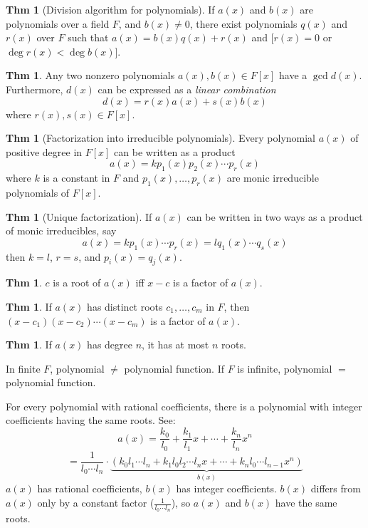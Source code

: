 \documentclass{article}
\theoremstyle{definition}
\newtheorem{theorem}[definition]{Thm}
\begin{document}
\begin{theorem}[Division algorithm for polynomials]
    If $a(x)$ and $b(x)$ are polynomials over a field $F$, and $b(x) \neq 0$, there exist polynomials $q(x)$ and $r(x)$ over $F$ such that
    $a(x) = b(x) q(x) + r(x)$ and
    [$r(x) = 0$ or $\deg r(x) < \deg b(x)$].
\end{theorem}

\begin{theorem}
    Any two nonzero polynomials $a(x), b(x) \in F[x]$ have a $\gcd d(x)$. Furthermore, $d(x)$ can be expressed as a \emph{linear combination}
    $$d(x)= r(x) a(x) + s(x) b(x)$$
    where $r(x), s(x) \in F[x]$.
\end{theorem}

\begin{theorem}[Factorization into irreducible polynomials]
    Every polynomial $a(x)$ of positive degree in $F[x]$ can be written as a product
    $$a(x) = k p_1(x) p_2(x) \cdots p_r(x)$$
    where $k$ is a constant in $F$ and $p_1(x), \ldots, p_r(x)$ are monic irreducible polynomials of $F[x]$.
\end{theorem}

\begin{theorem}[Unique factorization]
    If $a(x)$ can be written in two ways as a product of monic irreducibles, say
    $$a(x) = k p_1(x) \cdots p_r(x) = l q_1(x) \cdots q_s(x)$$
    then $k=l$, $r=s$, and $p_i(x) = q_j(x)$.
\end{theorem}

\begin{theorem}
    $c$ is a root of $a(x)$ iff $x - c$ is a factor of $a(x)$.
\end{theorem}
\begin{theorem}
    If $a(x)$ has distinct roots $c_1, \ldots, c_m$ in $F$, then $(x-c_1)(x-c_2)\cdots(x-c_m)$ is a factor of $a(x)$.
\end{theorem}

\begin{theorem}
    If $a(x)$ has degree $n$, it has at most $n$ roots.
\end{theorem}

In finite $F$, polynomial $\neq$ polynomial function. If $F$ is infinite, polynomial $=$ polynomial function.

For every polynomial with rational coefficients, there is a polynomial with integer coefficients having the same roots. See:
$$a(x) = \frac{k_0}{l_0} + \frac{k_1}{l_1} x + \cdots + \frac{k_n}{l_n} x^n$$
$$=\frac{1}{l_0 \cdots l_n} \cdot \underbrace{(k_0 l_1 \cdots l_n + k_1 l_0 l_2 \cdots l_n x + \cdots + k_n l_0 \cdots l_{n-1} x^n)}_{b(x)}$$
$a(x)$ has rational coefficients, $b(x)$ has integer coefficients. $b(x)$ differs from $a(x)$ only by a constant factor ($\frac{1}{l_0\cdots l_n}$), so $a(x)$ and $b(x)$ have the same roots.
\end{document}

